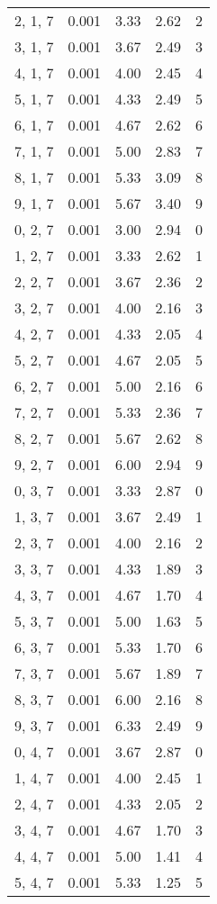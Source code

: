 \documentclass[12pt]{article}
\begin{document}
\begin{tabular}{c || c || c | c | c}
2, 1, 7 & 0.001 & 3.33 & 2.62 & 2 \\
3, 1, 7 & 0.001 & 3.67 & 2.49 & 3 \\
4, 1, 7 & 0.001 & 4.00 & 2.45 & 4 \\
5, 1, 7 & 0.001 & 4.33 & 2.49 & 5 \\
6, 1, 7 & 0.001 & 4.67 & 2.62 & 6 \\
7, 1, 7 & 0.001 & 5.00 & 2.83 & 7 \\
8, 1, 7 & 0.001 & 5.33 & 3.09 & 8 \\
9, 1, 7 & 0.001 & 5.67 & 3.40 & 9 \\
0, 2, 7 & 0.001 & 3.00 & 2.94 & 0 \\
1, 2, 7 & 0.001 & 3.33 & 2.62 & 1 \\
2, 2, 7 & 0.001 & 3.67 & 2.36 & 2 \\
3, 2, 7 & 0.001 & 4.00 & 2.16 & 3 \\
4, 2, 7 & 0.001 & 4.33 & 2.05 & 4 \\
5, 2, 7 & 0.001 & 4.67 & 2.05 & 5 \\
6, 2, 7 & 0.001 & 5.00 & 2.16 & 6 \\
7, 2, 7 & 0.001 & 5.33 & 2.36 & 7 \\
8, 2, 7 & 0.001 & 5.67 & 2.62 & 8 \\
9, 2, 7 & 0.001 & 6.00 & 2.94 & 9 \\
0, 3, 7 & 0.001 & 3.33 & 2.87 & 0 \\
1, 3, 7 & 0.001 & 3.67 & 2.49 & 1 \\
2, 3, 7 & 0.001 & 4.00 & 2.16 & 2 \\
3, 3, 7 & 0.001 & 4.33 & 1.89 & 3 \\
4, 3, 7 & 0.001 & 4.67 & 1.70 & 4 \\
5, 3, 7 & 0.001 & 5.00 & 1.63 & 5 \\
6, 3, 7 & 0.001 & 5.33 & 1.70 & 6 \\
7, 3, 7 & 0.001 & 5.67 & 1.89 & 7 \\
8, 3, 7 & 0.001 & 6.00 & 2.16 & 8 \\
9, 3, 7 & 0.001 & 6.33 & 2.49 & 9 \\
0, 4, 7 & 0.001 & 3.67 & 2.87 & 0 \\
1, 4, 7 & 0.001 & 4.00 & 2.45 & 1 \\
2, 4, 7 & 0.001 & 4.33 & 2.05 & 2 \\
3, 4, 7 & 0.001 & 4.67 & 1.70 & 3 \\
4, 4, 7 & 0.001 & 5.00 & 1.41 & 4 \\
5, 4, 7 & 0.001 & 5.33 & 1.25 & 5 \\

\end{tabular}
\end{document}
